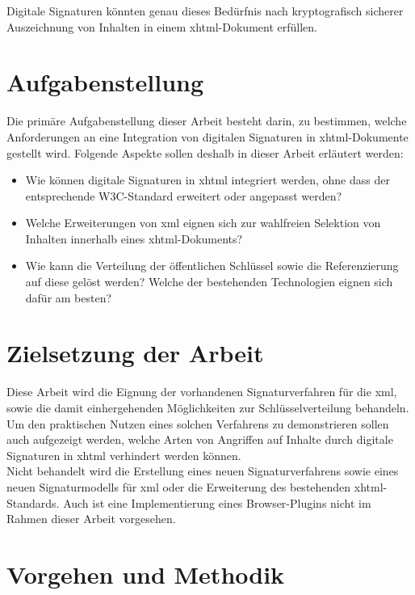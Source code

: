Digitale Signaturen könnten genau dieses Bedürfnis nach kryptografisch sicherer Auszeichnung von Inhalten in einem \gls{xhtml}-Dokument erfüllen.

\section{Aufgabenstellung}
%
\label{sec:Einleitung:aufgabenstellung}
Die primäre Aufgabenstellung dieser Arbeit besteht darin, zu bestimmen, welche Anforderungen an eine Integration von digitalen Signaturen in
\gls{xhtml}-Dokumente gestellt wird. Folgende Aspekte sollen deshalb in dieser Arbeit erläutert werden:
\begin{itemize}
    \item Wie können digitale Signaturen in \gls{xhtml} integriert werden, ohne dass der entsprechende W3C-Standard\cite{xhtml:w3c} erweitert oder angepasst
    werden?
    \item Welche Erweiterungen von \gls{xml} eignen sich zur wahlfreien Selektion von Inhalten innerhalb eines \gls{xhtml}-Dokuments?
    \item Wie kann die Verteilung der öffentlichen Schlüssel sowie die Referenzierung auf diese gelöst werden? Welche der bestehenden Technologien eignen sich
    dafür am besten?
\end{itemize}

\section{Zielsetzung der Arbeit}
\label{sec:Einleitung:ziele}
Diese Arbeit wird die Eignung der vorhandenen Signaturverfahren für die \gls{xml}, sowie die damit einhergehenden Möglichkeiten zur Schlüsselverteilung
behandeln. Um den praktischen Nutzen eines solchen Verfahrens zu demonstrieren sollen auch aufgezeigt werden, welche Arten von Angriffen auf Inhalte durch
digitale Signaturen in \gls{xhtml} verhindert werden können.\\

Nicht behandelt wird die Erstellung eines neuen Signaturverfahrens sowie eines neuen Signaturmodells für \gls{xml} oder die Erweiterung des bestehenden
\gls{xhtml}-Standards. Auch ist eine Implementierung eines Browser-Plugins nicht im Rahmen dieser Arbeit vorgesehen.

\section{Vorgehen und Methodik}
\label{sec:Einleitung:methodik}


